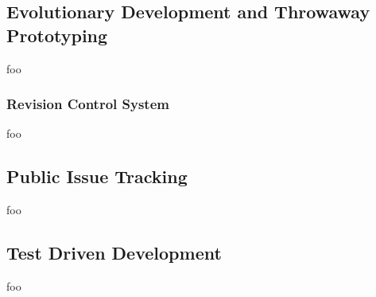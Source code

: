 
\subsection{Evolutionary Development and Throwaway Prototyping}

foo


\subsubsection{Revision Control System}

foo


\subsection{Public Issue Tracking}



foo


\subsection{Test Driven Development}

foo
